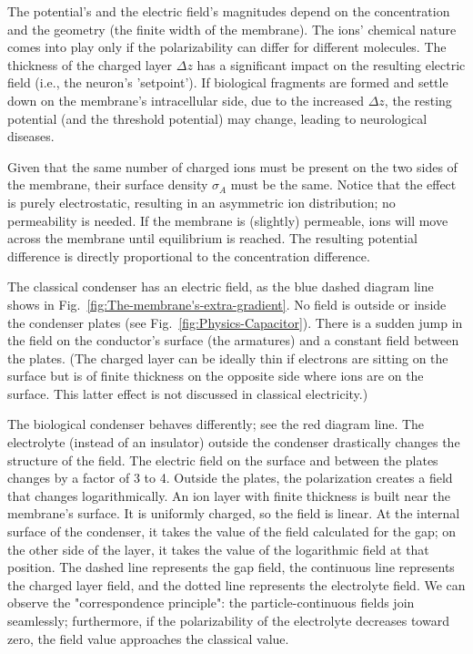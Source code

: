 The potential's and the electric field's magnitudes 
depend on the concentration and the geometry (the finite width of the membrane).
The ions' chemical nature comes into play only if the polarizability can differ for different molecules.
The thickness of the charged layer $\Delta z$ has a significant impact on the resulting electric field (i.e., the neuron's 'setpoint').
If biological fragments are formed and settle down on the membrane's intracellular side, due to the increased $\Delta z$,
the resting potential (and the threshold potential) may change, leading to neurological diseases.


Given that the same number of charged ions must be present
on the two sides of the membrane,
their surface density $\sigma_A$ must be the same. 
Notice that the effect is purely electrostatic, resulting in an asymmetric ion distribution; no permeability is needed. If the membrane is (slightly) permeable, ions will
move across the membrane until equilibrium is reached.
The resulting potential difference is directly proportional to the concentration difference.

The classical condenser has an electric field, as the blue dashed diagram line shows in Fig.~\ref{fig:The-membrane's-extra-gradient}. No field is outside or inside the condenser plates (see Fig.~\ref{fig:Physics-Capacitor}). There is a sudden jump in the field on the conductor's surface (the armatures) and a constant field between the plates.
(The charged layer can be ideally thin if electrons are sitting on the surface but is of finite thickness on the opposite side where ions are on the surface.  This latter effect is not discussed in classical electricity.)


The biological condenser behaves differently; see the
red diagram line. The electrolyte (instead of an insulator) outside the condenser drastically changes the structure of the field. The electric field on the surface and between the plates changes by a factor of 3 to 4. Outside the plates, the polarization creates a field that changes logarithmically. An ion layer with finite thickness is built near the membrane's surface. It is uniformly charged, so the field is linear. At the internal surface of the condenser, it takes the value of the field calculated for the gap; on the other side of the layer, it takes the value of the logarithmic field at that position.  The dashed line represents the gap field, the continuous line represents the charged layer field, and the dotted line represents the electrolyte field. We can observe the "correspondence principle": the particle-continuous fields join seamlessly; furthermore, if the polarizability of the electrolyte decreases toward zero, the field value approaches the classical value.


